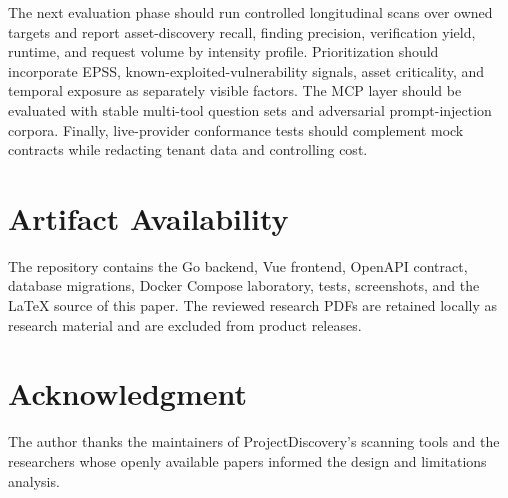 \documentclass[conference,a4paper]{IEEEtran}
\begin{document}
The next evaluation phase should run controlled longitudinal scans over owned targets and report asset-discovery recall, finding precision, verification yield, runtime, and request volume by intensity profile. Prioritization should incorporate EPSS, known-exploited-vulnerability signals, asset criticality, and temporal exposure as separately visible factors. The MCP layer should be evaluated with stable multi-tool question sets and adversarial prompt-injection corpora. Finally, live-provider conformance tests should complement mock contracts while redacting tenant data and controlling cost.

\section*{Artifact Availability}

The repository contains the Go backend, Vue frontend, OpenAPI contract, database migrations, Docker Compose laboratory, tests, screenshots, and the LaTeX source of this paper. The reviewed research PDFs are retained locally as research material and are excluded from product releases.

\section*{Acknowledgment}

The author thanks the maintainers of ProjectDiscovery's scanning tools and the researchers whose openly available papers informed the design and limitations analysis.

\balance


\end{document}
